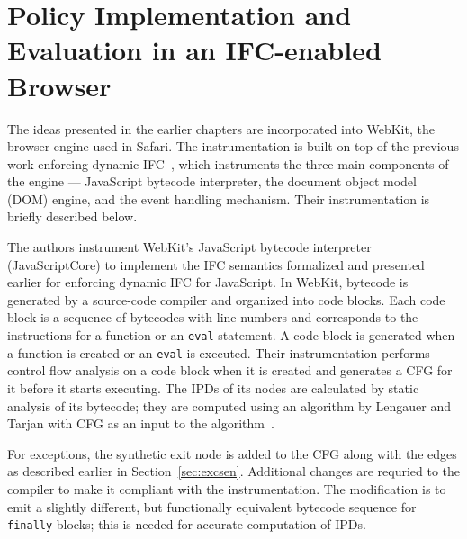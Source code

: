 \chapter{Policy Implementation and Evaluation in an IFC-enabled Browser}
\label{ch:eval}

The ideas presented in the earlier chapters are incorporated into
WebKit, the browser engine used in Safari. The instrumentation is
built on top of the previous work enforcing dynamic
IFC~\cite{just11PLASTIC, post14, csf15}, which 
instruments the three main components of the engine --- JavaScript 
bytecode interpreter, the document object model (DOM) engine, and the
event handling mechanism. Their instrumentation is briefly described
below. 

The authors instrument WebKit’s JavaScript bytecode interpreter (JavaScriptCore) 
to implement the IFC semantics formalized and presented earlier for
enforcing dynamic IFC for JavaScript. In WebKit, bytecode is generated
by a source-code compiler and organized into code blocks. Each code
block is a sequence of bytecodes with line numbers and corresponds to
the instructions for a function or an \texttt{eval} statement. A code
block is generated when a function is created or an \texttt{eval} is
executed. Their instrumentation performs control flow analysis on a
code block when it is created and generates a CFG for it before it
starts executing. The IPDs of its nodes are calculated by static
analysis of its bytecode; they are computed using an algorithm by
Lengauer and Tarjan with CFG as an input to the
algorithm~\cite{Lengauer}.  

For exceptions, the synthetic exit node is added to the CFG
along with the edges as described earlier in
Section~\ref{sec:excsen}. Additional changes are requried to the
compiler to make it compliant with the instrumentation. The
modification is to emit a slightly different, but functionally
equivalent bytecode sequence for \texttt{finally} blocks; 
this is needed for accurate computation of IPDs. 

